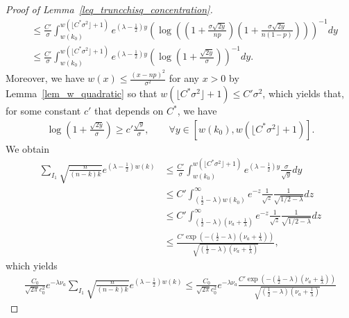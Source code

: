 \documentclass{article}
\begin{document}
\begin{proof}[Proof of Lemma~\ref{leq_truncchisq_concentration}]
\begin{align*}
     & \leq \frac{C'}{\sigma} \int_{w(k_0)}^{w(\lfloor C^*\sigma^2\rfloor + 1)} e^{(\lambda - \frac{1}{2}) y} \left(\log\left(\left(1+ \frac{\sigma\sqrt{2y}}{np}\right) \left(1+\frac{\sigma\sqrt{2y}}{n(1-p)}\right)\right)\right)^{-1} dy\\
     & \leq \frac{C'}{\sigma} \int_{w(k_0)}^{w(\lfloor C^*\sigma^2\rfloor + 1)} e^{(\lambda - \frac{1}{2}) y} \left(\log\left(1+ \frac{\sqrt{2y}}{\sigma}\right)\right)^{-1} dy.
 \end{align*}
Moreover, we have $w(x) \leq \frac{(x-np)^2}{\sigma^2} $ for any $x >0$ by Lemma~\ref{lem_w_quadratic} so that $w(\lfloor C^*\sigma^2\rfloor + 1) \leq C' \sigma^2$, which yields that, for some constant $c'$ that depends on $C^*$, we have
\begin{align*}
    \log\left(1+ \frac{\sqrt{2y}}{\sigma}\right) \geq c'\frac{\sqrt{y}}{\sigma}, \qquad \forall y \in \left[{w(k_0)},{w(\lfloor C^*\sigma^2\rfloor + 1)} \right].
\end{align*}
We obtain
\begin{align*}
    \sum_{I_1} \sqrt{\frac{n}{(n-k)k}} e^{\left(\lambda - \frac{1}{2}\right)w(k)}
    & \leq \frac{C'}{\sigma} \int_{w(k_0)}^{w(\lfloor C^*\sigma^2\rfloor + 1)} e^{(\lambda - \frac{1}{2}) y} \frac{\sigma}{\sqrt{y}} dy\\[5pt]
    & \leq C' \int_{(\frac{1}{2} - \lambda)w(k_0)}^\infty e^{-z} \frac{1}{\sqrt{z}} \frac{1}{\sqrt{1/2 - \lambda}} dz\\[5pt]
    & \leq C' \int_{(\frac{1}{2} - \lambda)(\nu_a + \frac{1}{\lambda})}^\infty e^{-z} \frac{1}{\sqrt{z}} \frac{1}{\sqrt{1/2 - \lambda}} dz\\[5pt]
    & \leq \frac{C' \exp\left(- (\frac{1}{2} - \lambda)(\nu_a + \frac{1}{\lambda})\right)}{\sqrt{(\frac{1}{2} - \lambda)(\nu_a + \frac{1}{\lambda})}},
\end{align*}
which yields
\begin{align}
    \frac{C_0}{\sqrt{2\pi}c_0^2} e^{-\lambda \nu_a} \sum_{I_1} \sqrt{\frac{n}{(n-k)k}} e^{\left(\lambda - \frac{1}{2}\right)w(k)} \leq \frac{C_0}{\sqrt{2\pi}c_0^2} e^{-\lambda \nu_a} \frac{C' \exp\left(- (\frac{1}{2} - \lambda)(\nu_a + \frac{1}{\lambda})\right)}{\sqrt{(\frac{1}{2} - \lambda)(\nu_a + \frac{1}{\lambda})}}\label{eq_thirn_term_I1}
\end{align}



\end{proof}
\end{document}
